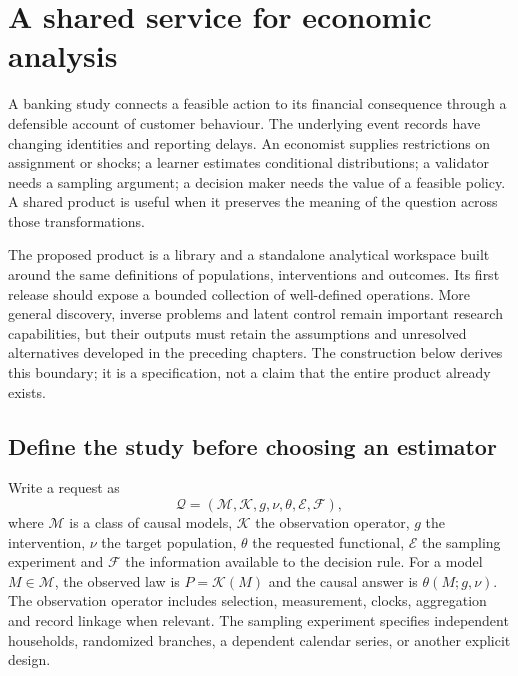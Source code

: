 \chapter{A shared service for economic analysis}
\label{r3:product}

A banking study connects a feasible action to its financial consequence
through a defensible account of customer behaviour. The underlying event
records have changing identities and reporting delays. An economist supplies restrictions on
assignment or shocks; a learner estimates conditional distributions; a
validator needs a sampling argument; a decision maker needs the value of
a feasible policy. A shared product is useful when it preserves the
meaning of the question across those transformations.

The proposed product is a library and a standalone analytical workspace
built around the same definitions of populations, interventions and outcomes. Its first release should expose
a bounded collection of well-defined operations. More general discovery,
inverse problems and latent control remain important research capabilities,
but their outputs must retain the assumptions and unresolved alternatives
developed in the preceding chapters. The construction below derives this
boundary; it is a specification, not a claim that the entire product
already exists.

\section{Define the study before choosing an estimator}
\label{r3:request-type}

Write a request as
\begin{equation}
 \mathcal Q=(\mathcal M,\mathcal K,g,\nu,\theta,\mathcal E,\mathcal F),
 \label{r3:request}
\end{equation}
where $\mathcal M$ is a class of causal models, $\mathcal K$ the observation
operator, $g$ the intervention, $\nu$ the target population, $\theta$
the requested functional, $\mathcal E$ the sampling experiment and
$\mathcal F$ the information available to the decision rule. For a model
$M\in\mathcal M$, the observed law is $P=\mathcal K(M)$ and the causal
answer is $\theta(M;g,\nu)$. The observation operator includes selection,
measurement, clocks, aggregation and record linkage when relevant.
The sampling experiment specifies independent households, randomized
branches, a dependent calendar series, or another explicit design.

